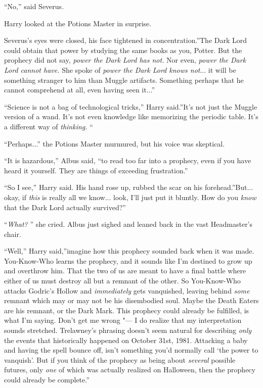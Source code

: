 ``No,'' said Severus.

Harry looked at the Potions Master in surprise.

Severus's eyes were closed, his face tightened in concentration.''The
Dark Lord could obtain that power by studying the same books as you,
Potter. But the prophecy did not say, \emph{power the Dark Lord has
not.} Nor even, \emph{power the Dark Lord cannot have.} She spoke of
\emph{power the Dark Lord knows not}... it will be something
stranger to him than Muggle artifacts. Something perhaps that he cannot
comprehend at all, even having seen it...''

``Science is not a bag of technological tricks,'' Harry said.''It's not
just the Muggle version of a wand. It's not even knowledge like
memorizing the periodic table. It's a different way of \emph{thinking.}
``

``Perhaps...'' the Potions Master murmured, but his voice was
skeptical.

``It is hazardous,'' Albus said, ``to read too far into a prophecy, even
if you have heard it yourself. They are things of exceeding
frustration.''

``So I see,'' Harry said. His hand rose up, rubbed the scar on his
forehead.''But... okay, if \emph{this} is really all we
know... look, I'll just put it bluntly. How do you \emph{know} that
the Dark Lord actually survived?''

``\emph{What?} '' she cried. Albus just sighed and leaned back in the vast
Headmaster's chair.

``Well,'' Harry said,''imagine how this prophecy sounded back when it
was made. You-Know-Who learns the prophecy, and it sounds like I'm
destined to grow up and overthrow him. That the two of us are meant to
have a final battle where either of us must destroy all but a remnant of
the other. So You-Know-Who attacks Godric's Hollow and
\emph{immediately} gets vanquished, leaving behind \emph{some} remnant
which may or may not be his disembodied soul. Maybe the Death Eaters are
his remnant, or the Dark Mark. This prophecy could already be fulfilled,
is what I'm saying. Don't get me wrong "--- I do realize that my
interpretation sounds stretched. Trelawney's phrasing doesn't seem
natural for describing \emph{only} the events that historically happened
on October 31st, 1981. Attacking a baby and having the spell bounce off,
isn't something you'd normally call `the power to vanquish'. But if you
think of the prophecy as being about \emph{several} possible futures,
only \emph{one} of which was actually realized on Halloween, then the
prophecy could already be complete.''


